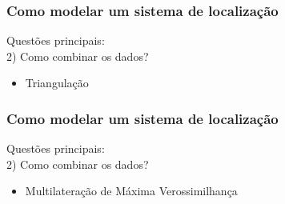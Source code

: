 \documentclass{beamer}
\begin{document}
\begin{frame}
\frametitle{\normalsize Como modelar um sistema de localização}
\begin{flushleft}
	Questões principais: \\
	\hspace{0.5cm} 2) Como combinar os dados?
	\begin{itemize}
		\item Triangulação
	\end{itemize}
	
	\begin{figure}
	\end{figure}
	\vspace{0.4cm}
\end{flushleft}
\end{frame}


\begin{frame}
\frametitle{\normalsize Como modelar um sistema de localização}
\begin{flushleft}
	Questões principais: \\
	\hspace{0.5cm} 2) Como combinar os dados?
	\begin{itemize}
		\item Multilateração de Máxima Verossimilhança
	\end{itemize}
	\begin{figure}
	\hspace{3.5cm}	
	\end{figure}
	\vspace{0.4cm}
\end{flushleft}
\end{frame}
\end{document}
